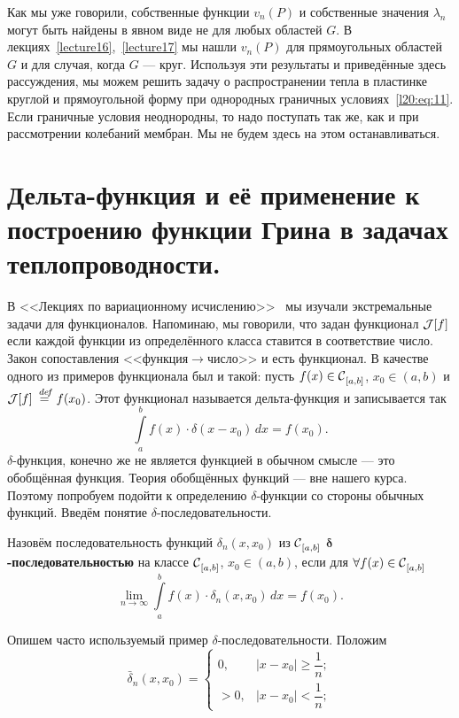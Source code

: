 Как мы уже говорили, собственные функции $v_n(P)$ и собственные значения $\lambda_n$ могут быть найдены в явном виде не для любых областей $G$. В лекциях~\ref{lecture16},~\ref{lecture17} мы нашли $v_n(P)$ для прямоугольных областей $G$ и для случая, когда $G$ --- круг. Используя эти результаты и приведённые здесь рассуждения, мы можем решить задачу о распространении тепла в пластинке круглой и прямоугольной форму при однородных граничных условиях~\eqref{l20:eq:11}. Если граничные условия неоднородны, то надо поступать так же, как и при рассмотрении колебаний мембран. Мы не будем здесь на этом останавливаться.

\section[Дельта-функция.]{Дельта-функция и её применение к построению функции Грина в задачах теплопроводности.}
\label{lecture20section3}
В <<Лекциях по вариационному исчислению>>~\cite{VI} мы изучали экстремальные задачи для функционалов. Напоминаю, мы говорили, что задан функционал $\J[f]$ если каждой функции из определённого класса ставится в соответствие число. Закон сопоставления <<функция$\rightarrow$число>> и есть функционал. В качестве одного из примеров функционала был и такой: пусть $f(x)\in\Cfn[{[a,b]}]{}$, $x_0\in(a,b)$ и $\J[f]\eqdef f(x_0)$. Этот функционал называется дельта-функция и записывается так
\begin{equation}\label{l20:eq:19}
	\int\limits_a^b f(x)\cdot\delta(x-x_0)\,dx=f(x_0).
\end{equation} 
$\delta$-функция, конечно же не является функцией в обычном смысле --- это обобщённая функция. Теория обобщённых функций --- вне нашего курса. Поэтому попробуем подойти к определению $\delta$-функции со стороны обычных функций. Введём понятие $\delta$-последовательности.
\begin{_definition}
	Назовём последовательность функций $\delta_n(x,x_0)$ из $\Cfn[{[a,b]}]{}$  \textbf{$\bm{\delta}$-последовательностью} на классе $\Cfn[{[a,b]}]{}$, $x_0\in(a,b)$, если для $\forall f(x)\?\in\Cfn[{[a,b]}]{}$
	\begin{equation}\label{l20:eq:20}
		\lim\limits_{n\to\infty}\int\limits_a^b f(x)\cdot\delta_n(x,x_0)\,dx=f(x_0).
	\end{equation}
\end{_definition}
Опишем часто используемый пример $\delta$-последовательности. Положим
\begin{equation*}
	\bar{\delta}_n(x,x_0)=\begin{cases}
		0,&|x-x_0|\geqslant\dfrac{1}{n};\\[7pt]
		>0,&|x-x_0|<\dfrac{1}{n};
	\end{cases}
\end{equation*} 
